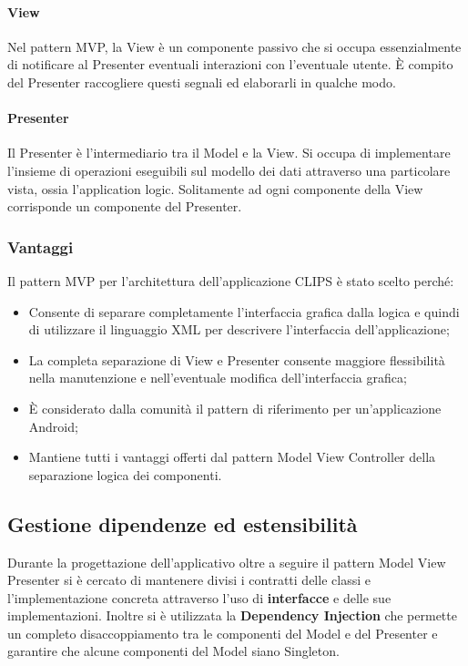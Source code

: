 \documentclass[../ManualeSviluppatore.tex]{subfiles}
\begin{document}
				\paragraph*{View}
					Nel pattern MVP, la View è un componente passivo che si occupa essenzialmente di notificare al Presenter eventuali interazioni con l'eventuale utente. È compito del Presenter raccogliere questi segnali ed elaborarli in qualche modo.
					
				\paragraph*{Presenter}
					Il Presenter è l'intermediario tra il Model e la View. Si occupa di implementare l'insieme di operazioni eseguibili sul modello dei dati attraverso una particolare vista, ossia l'application logic. Solitamente ad ogni componente della View corrisponde un componente del Presenter.
					
			\subsubsection{Vantaggi}
				Il pattern MVP per l'architettura dell'applicazione CLIPS è stato scelto perché:
				\begin{itemize}
					\item Consente di separare completamente l'interfaccia grafica dalla logica e quindi di utilizzare il linguaggio XML per descrivere l'interfaccia dell'applicazione;
					\item La completa separazione di View e Presenter consente maggiore flessibilità nella manutenzione e nell'eventuale modifica dell'interfaccia grafica;
					\item È considerato dalla comunità il pattern di riferimento per un'applicazione Android;
					\item Mantiene tutti i vantaggi offerti dal pattern Model View Controller della separazione logica dei componenti.
				\end{itemize}
	
	
	\subsection{Gestione dipendenze ed estensibilità}
		Durante la progettazione dell'applicativo oltre a seguire il pattern Model View Presenter si è cercato di mantenere divisi i contratti delle classi e l'implementazione concreta attraverso l'uso di \textbf{interfacce} e delle sue implementazioni.
		Inoltre si è utilizzata la \textbf{Dependency Injection} che permette un completo disaccoppiamento tra le componenti del Model e del Presenter e garantire che alcune componenti del Model siano Singleton.
		
\end{document}
